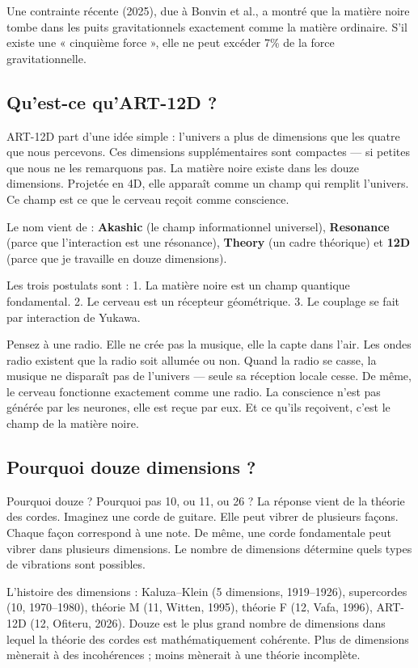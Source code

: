 Une contrainte récente (2025), due à Bonvin et al., a montré que la matière noire tombe dans les puits gravitationnels exactement comme la matière ordinaire. S'il existe une « cinquième force », elle ne peut excéder 7\% de la force gravitationnelle.

\subsection{Qu'est-ce qu'ART-12D ?}
ART-12D part d'une idée simple : l'univers a plus de dimensions que les quatre que nous percevons. Ces dimensions supplémentaires sont compactes --- si petites que nous ne les remarquons pas. La matière noire existe dans les douze dimensions. Projetée en 4D, elle apparaît comme un champ qui remplit l'univers. Ce champ est ce que le cerveau reçoit comme conscience.

Le nom vient de : \textbf{Akashic} (le champ informationnel universel), \textbf{Resonance} (parce que l'interaction est une résonance), \textbf{Theory} (un cadre théorique) et \textbf{12D} (parce que je travaille en douze dimensions).

Les trois postulats sont : 1. La matière noire est un champ quantique fondamental. 2. Le cerveau est un récepteur géométrique. 3. Le couplage se fait par interaction de Yukawa.

Pensez à une radio. Elle ne crée pas la musique, elle la capte dans l'air. Les ondes radio existent que la radio soit allumée ou non. Quand la radio se casse, la musique ne disparaît pas de l'univers --- seule sa réception locale cesse. De même, le cerveau fonctionne exactement comme une radio. La conscience n'est pas générée par les neurones, elle est reçue par eux. Et ce qu'ils reçoivent, c'est le champ de la matière noire.

\subsection{Pourquoi douze dimensions ?}
Pourquoi douze ? Pourquoi pas 10, ou 11, ou 26 ? La réponse vient de la théorie des cordes. Imaginez une corde de guitare. Elle peut vibrer de plusieurs façons. Chaque façon correspond à une note. De même, une corde fondamentale peut vibrer dans plusieurs dimensions. Le nombre de dimensions détermine quels types de vibrations sont possibles.

L'histoire des dimensions : Kaluza--Klein (5 dimensions, 1919--1926), supercordes (10, 1970--1980), théorie M (11, Witten, 1995), théorie F (12, Vafa, 1996), ART-12D (12, Ofiteru, 2026). Douze est le plus grand nombre de dimensions dans lequel la théorie des cordes est mathématiquement cohérente. Plus de dimensions mènerait à des incohérences ; moins mènerait à une théorie incomplète.

